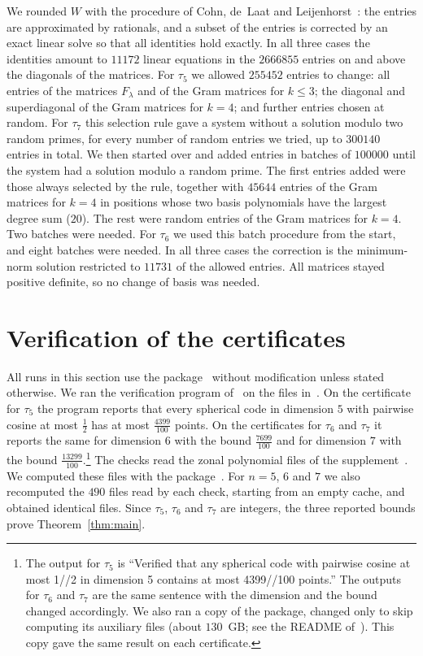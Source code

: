 \documentclass[11pt]{amsart}
\theoremstyle{remark}
\begin{document}
We rounded $W$ with the procedure of Cohn, de~Laat and Leijenhorst~\cite{CdLL}: the entries are approximated by rationals, and a subset of the entries is corrected by an exact linear solve so that all identities hold exactly. In all three cases the identities amount to $11172$ linear equations in the $2666855$ entries on and above the diagonals of the matrices. For $\tau_5$ we allowed $255452$ entries to change: all entries of the matrices $F_\lambda$ and of the Gram matrices for $k\le3$; the diagonal and superdiagonal of the Gram matrices for $k=4$; and further entries chosen at random. For $\tau_7$ this selection rule gave a system without a solution modulo two random primes, for every number of random entries we tried, up to $300140$ entries in total. We then started over and added entries in batches of $100000$ until the system had a solution modulo a random prime. The first entries added were those always selected by the rule, together with $45644$ entries of the Gram matrices for $k=4$ in positions whose two basis polynomials have the largest degree sum ($20$). The rest were random entries of the Gram matrices for $k=4$. Two batches were needed. For $\tau_6$ we used this batch procedure from the start, and eight batches were needed. In all three cases the correction is the minimum-norm solution restricted to $11731$ of the allowed entries. All matrices stayed positive definite, so no change of basis was needed.

\section{Verification of the certificates}\label{sec:verify}

All runs in this section use the package~\cite{LLMdata} without modification unless stated otherwise. We ran the verification program of~\cite{LLM} on the files in~\cite{supp5}. On the certificate for $\tau_5$ the program reports that every spherical code in dimension $5$ with pairwise cosine at most $\frac12$ has at most $\frac{4399}{100}$ points. On the certificates for $\tau_6$ and $\tau_7$ it reports the same for dimension $6$ with the bound $\frac{7699}{100}$ and for dimension $7$ with the bound $\frac{13299}{100}$.\footnote{The output for $\tau_5$ is ``Verified that any spherical code with pairwise cosine at most 1//2 in dimension 5 contains at most 4399//100 points.'' The outputs for $\tau_6$ and $\tau_7$ are the same sentence with the dimension and the bound changed accordingly. We also ran a copy of the package, changed only to skip computing its auxiliary files (about $130$~GB; see the README of~\cite{supp5}). This copy gave the same result on each certificate.} The checks read the zonal polynomial files of the supplement~\cite{supp5}. We computed these files with the package~\cite{LLMdata}. For $n=5$, $6$ and $7$ we also recomputed the $490$ files read by each check, starting from an empty cache, and obtained identical files. Since $\tau_5$, $\tau_6$ and $\tau_7$ are integers, the three reported bounds prove Theorem~\ref{thm:main}.
\end{document}
